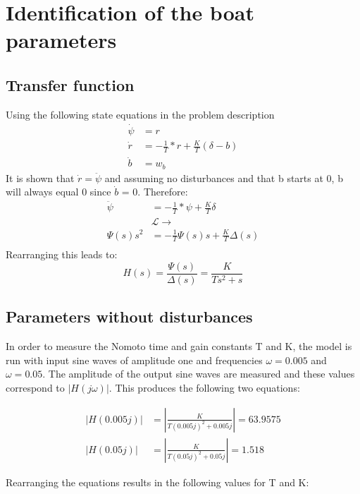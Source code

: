 \section{Identification of the boat parameters}
\subsection{Transfer function}
Using the following state equations in the problem description \cite{assignment}
%
\begin{align*}
    \dot{\psi} &= r \\
    \dot{r} &= -\frac{1}{T}*r + \frac{K}{T}(\delta - b) \\
    \dot{b} &= w_b
\end{align*}
%
It is shown that $\dot{r} = \ddot{\psi}$ and assuming no disturbances and that b starts at 0, b will
always equal 0 since $\dot{b}$ = 0. Therefore:
%
\begin{align*}
    \ddot{\psi} &= -\frac{1}{T}*\psi + \frac{K}{T}\delta \\
    &\mathcal{L}\rightarrow  \\
    \Psi(s)s^2  &= -\frac{1}{T}\Psi(s)s + \frac{K}{T}\Delta(s) \\
\end{align*}
%
Rearranging this leads to:
\begin{equation}
\label{eq:rudder to compass transfer function}
    H(s) = \frac{\Psi(s)}{\Delta(s)} = \frac{K}{Ts^2 + s}
\end{equation}

\subsection{Parameters without disturbances}
In order to measure the Nomoto time and gain constants T and K, the model is run with input sine waves
of amplitude one and frequencies $\omega = 0.005$ and $\omega = 0.05$. The amplitude of the output sine
waves are measured and these values correspond to $\left|H(j\omega)\right|$. This produces the following two
equations:

\begin{align*}
    \left|H(0.005j)\right| &= \left|\frac{K}{T(0.005j)^2 + 0.005j}\right| = 63.9575 \\
    \left|H(0.05j)\right| &= \left|\frac{K}{T(0.05j)^2 + 0.05j}\right| = 1.518
\end{align*}

Rearranging the equations results in the following values for T and K:

